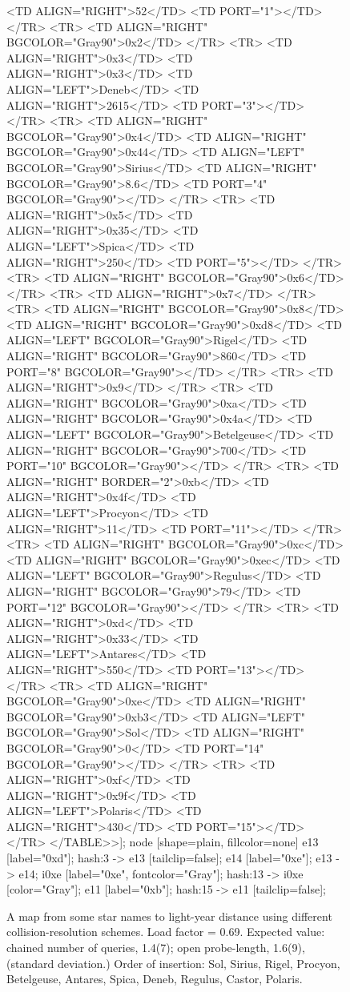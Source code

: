 \documentclass[12pt]{article}
\begin{document}
\begin{figure}
{{		<TD ALIGN="RIGHT">52</TD>
		<TD PORT="1">
	</TR>
	<TR>
		<TD ALIGN="RIGHT" BGCOLOR="Gray90">0x2</TD>
	</TR>
	<TR>
		<TD ALIGN="RIGHT">0x3</TD>
		<TD ALIGN="RIGHT">0x3</TD>
		<TD ALIGN="LEFT">Deneb</TD>
		<TD ALIGN="RIGHT">2615</TD>
		<TD PORT="3">
	</TR>
	<TR>
		<TD ALIGN="RIGHT" BGCOLOR="Gray90">0x4</TD>
		<TD ALIGN="RIGHT" BGCOLOR="Gray90">0x44</TD>
		<TD ALIGN="LEFT" BGCOLOR="Gray90">Sirius</TD>
		<TD ALIGN="RIGHT" BGCOLOR="Gray90">8.6</TD>
		<TD PORT="4" BGCOLOR="Gray90">
	</TR>
	<TR>
		<TD ALIGN="RIGHT">0x5</TD>
		<TD ALIGN="RIGHT">0x35</TD>
		<TD ALIGN="LEFT">Spica</TD>
		<TD ALIGN="RIGHT">250</TD>
		<TD PORT="5">
	</TR>
	<TR>
		<TD ALIGN="RIGHT" BGCOLOR="Gray90">0x6</TD>
	</TR>
	<TR>
		<TD ALIGN="RIGHT">0x7</TD>
	</TR>
	<TR>
		<TD ALIGN="RIGHT" BGCOLOR="Gray90">0x8</TD>
		<TD ALIGN="RIGHT" BGCOLOR="Gray90">0xd8</TD>
		<TD ALIGN="LEFT" BGCOLOR="Gray90">Rigel</TD>
		<TD ALIGN="RIGHT" BGCOLOR="Gray90">860</TD>
		<TD PORT="8" BGCOLOR="Gray90">
	</TR>
	<TR>
		<TD ALIGN="RIGHT">0x9</TD>
	</TR>
	<TR>
		<TD ALIGN="RIGHT" BGCOLOR="Gray90">0xa</TD>
		<TD ALIGN="RIGHT" BGCOLOR="Gray90">0x4a</TD>
		<TD ALIGN="LEFT" BGCOLOR="Gray90">Betelgeuse</TD>
		<TD ALIGN="RIGHT" BGCOLOR="Gray90">700</TD>
		<TD PORT="10" BGCOLOR="Gray90">
	</TR>
	<TR>
		<TD ALIGN="RIGHT" BORDER="2">0xb</TD>
		<TD ALIGN="RIGHT">0x4f</TD>
		<TD ALIGN="LEFT">Procyon</TD>
		<TD ALIGN="RIGHT">11</TD>
		<TD PORT="11">
	</TR>
	<TR>
		<TD ALIGN="RIGHT" BGCOLOR="Gray90">0xc</TD>
		<TD ALIGN="RIGHT" BGCOLOR="Gray90">0xec</TD>
		<TD ALIGN="LEFT" BGCOLOR="Gray90">Regulus</TD>
		<TD ALIGN="RIGHT" BGCOLOR="Gray90">79</TD>
		<TD PORT="12" BGCOLOR="Gray90">
	</TR>
	<TR>
		<TD ALIGN="RIGHT">0xd</TD>
		<TD ALIGN="RIGHT">0x33</TD>
		<TD ALIGN="LEFT">Antares</TD>
		<TD ALIGN="RIGHT">550</TD>
		<TD PORT="13">
	</TR>
	<TR>
		<TD ALIGN="RIGHT" BGCOLOR="Gray90">0xe</TD>
		<TD ALIGN="RIGHT" BGCOLOR="Gray90">0xb3</TD>
		<TD ALIGN="LEFT" BGCOLOR="Gray90">Sol</TD>
		<TD ALIGN="RIGHT" BGCOLOR="Gray90">0</TD>
		<TD PORT="14" BGCOLOR="Gray90">
	</TR>
	<TR>
		<TD ALIGN="RIGHT">0xf</TD>
		<TD ALIGN="RIGHT">0x9f</TD>
		<TD ALIGN="LEFT">Polaris</TD>
		<TD ALIGN="RIGHT">430</TD>
		<TD PORT="15">
	</TR>
</TABLE>>];
	node [shape=plain, fillcolor=none]
	e13 [label="0xd"];
	hash:3 -> e13 [tailclip=false];
	e14 [label="0xe"];
	e13 -> e14;
	i0xe [label="0xe", fontcolor="Gray"];
	hash:13 -> i0xe [color="Gray"];
	e11 [label="0xb"];
	hash:15 -> e11 [tailclip=false];
		}
	}
	\caption{A map from some star names to light-year distance using different collision-resolution schemes. Load factor  = 0.69. Expected value: chained number of queries, 1.4(7);
open probe-length, 1.6(9),
(standard deviation.)\label{types}
Order of insertion: Sol, Sirius, Rigel, Procyon, Betelgeuse, Antares, Spica, Deneb, Regulus, Castor, Polaris.}
\end{figure}
\end{document}

